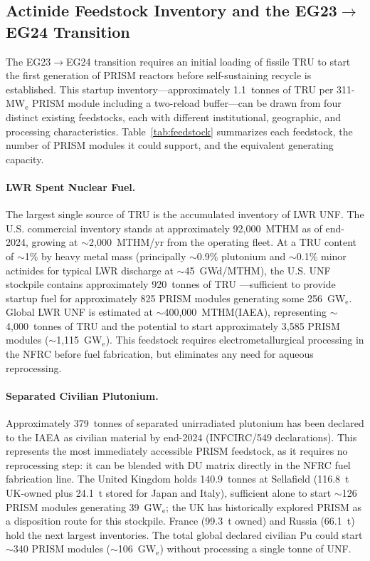 \documentclass[10pt,twoside]{article}
\begin{document}
\subsection{Actinide Feedstock Inventory and the EG23$\rightarrow$EG24
Transition}
\label{sec:feedstock}

The EG23$\rightarrow$EG24 transition requires an initial loading of fissile
TRU to start the first generation of PRISM reactors before self-sustaining
recycle is established.  This startup inventory---approximately 1.1~tonnes
of TRU per 311-MW$_\text{e}$ PRISM module including a two-reload
buffer\cite{Till2011}---can be drawn from four distinct existing feedstocks,
each with different institutional, geographic, and processing characteristics.
Table~\ref{tab:feedstock} summarizes each feedstock, the number of PRISM
modules it could support, and the equivalent generating capacity.

\paragraph{LWR Spent Nuclear Fuel.}
The largest single source of TRU is the accumulated inventory of LWR
UNF.  The U.S. commercial inventory stands at approximately 92{,}000~MTHM
as of end-2024, growing at $\sim$2{,}000~MTHM/yr from the operating
fleet.\cite{PNNL33938}  At a TRU content of $\sim$1\% by heavy metal mass
(principally $\sim$0.9\% plutonium and $\sim$0.1\% minor actinides for
typical LWR discharge at $\sim$45~GWd/MTHM),\cite{DOE_ES_2014} the U.S.
UNF stockpile contains approximately 920~tonnes of TRU\allowbreak
---sufficient to provide startup fuel for approximately 825 PRISM modules
generating some 256~GW$_\text{e}$.  Global LWR UNF is estimated at
$\sim$400{,}000~MTHM\@ (IAEA), representing $\sim$4{,}000~tonnes of TRU
and the potential to start approximately 3{,}585 PRISM modules
($\sim$1{,}115~GW$_\text{e}$).  This feedstock requires electrometallurgical
processing in the NFRC before fuel fabrication, but eliminates any need
for aqueous reprocessing.

\paragraph{Separated Civilian Plutonium.}
Approximately 379~tonnes of separated unirradiated plutonium has been
declared to the IAEA as civilian material by end-2024 (INFCIRC/549
declarations).\cite{IPFM2024}  This represents the most immediately
accessible PRISM feedstock, as it requires no reprocessing step: it can
be blended with DU matrix directly in the NFRC fuel fabrication line.
The United Kingdom holds 140.9~tonnes at Sellafield (116.8~t UK-owned
plus 24.1~t stored for Japan and Italy), sufficient alone to start
$\sim$126 PRISM modules generating 39~GW$_\text{e}$; the UK has
historically explored PRISM as a disposition route for this
stockpile.\cite{NRC1994}  France (99.3~t owned) and Russia (66.1~t)
hold the next largest inventories.  The total global declared civilian
Pu could start $\sim$340 PRISM modules ($\sim$106~GW$_\text{e}$)
without processing a single tonne of UNF.
\end{document}
